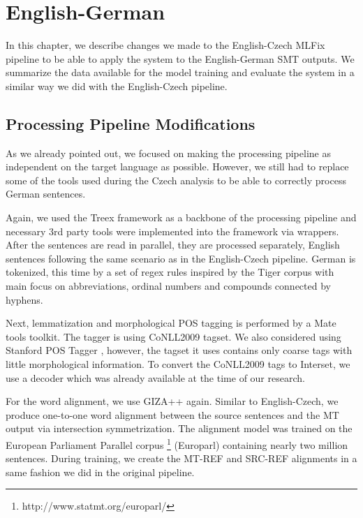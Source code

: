 \chapter{English-German}
\label{chap:german}

In this chapter, we describe changes we made to the English-Czech MLFix pipeline
to be able to apply the system to the English-German
SMT outputs. We summarize the data available for the model training
and evaluate the system in a similar way we did with the English-Czech
pipeline.

\section{Processing Pipeline Modifications}

As we already pointed out, we focused on making the processing pipeline as independent
on the target language as possible. However, we still had to replace some of the tools
used during the Czech analysis to be able to correctly process German sentences.

Again, we used the Treex framework as a backbone of the processing pipeline and
necessary 3rd party tools were implemented into the framework via wrappers.
After the sentences are read in parallel, they are processed separately, English sentences
following the same scenario as in the English-Czech pipeline.
German is tokenized, this time by a set of regex rules inspired by the Tiger corpus \citep{Brants2004}
with main focus on abbreviations, ordinal numbers and compounds connected by hyphens.

Next, lemmatization and morphological POS tagging is performed by a Mate tools
toolkit. The tagger is using CoNLL2009 \citep{CoNLL-2009-ST} tagset. We also considered using
Stanford POS Tagger \citep{Toutanova:2000:EKS:1117794.1117802},
however, the tagset it uses contains only coarse tags with little morphological information.
To convert the CoNLL2009 tags to Interset, we use a decoder which was already available at the
time of our research.

For the word alignment, we use GIZA++ again. Similar to English-Czech, we produce one-to-one word
alignment between the source sentences and the MT output
via intersection symmetrization. The alignment model was trained on the European
Parliament Parallel corpus \citep{koehn2005epc}\footnote{http://www.statmt.org/europarl/} (Europarl)
containing nearly two million sentences. 
During training, we create the MT-REF and SRC-REF alignments in a same fashion we did in the original
pipeline.

